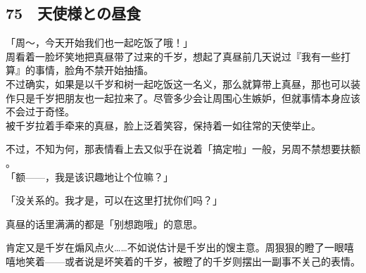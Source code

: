 \subsection{75　天使様との昼食}

「周～，今天开始我们也一起吃饭了哦！」\\

周看着一脸坏笑地把真昼带了过来的千岁，想起了真昼前几天说过『我有一些打算』的事情，脸角不禁开始抽搐。\\

不过确实，如果是以千岁和树一起吃饭这一名义，那么就算带上真昼，那也可以装作只是千岁把朋友也一起拉来了。尽管多少会让周围心生嫉妒，但就事情本身应该不会过于奇怪。\\

被千岁拉着手牵来的真昼，脸上泛着笑容，保持着一如往常的天使举止。

不过，不知为何，那表情看上去又似乎在说着「搞定啦」一般，另周不禁想要扶额 。\\

「额——，我是该识趣地让个位嘛？」

「没关系的。我才是，可以在这里打扰你们吗？」

真昼的话里满满的都是「别想跑哦」的意思。

肯定又是千岁在煽风点火……不如说估计是千岁出的馊主意。周狠狠的瞪了一眼嘻嘻地笑着——或者说是坏笑着的千岁，被瞪了的千岁则摆出一副事不关己的表情。\\

